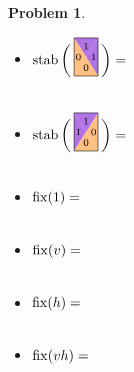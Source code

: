 \documentclass[12pt]{article}
\theoremstyle{definition} %
\newtheorem{problem}{Problem}
\begin{document}
\begin{problem}
\begin{enumerate}[(a)]
\begin{multicols}{2}
\begin{itemize}
      \item $\stab\bigg(
        \begin{tikzpicture}[yscale=1.618,scale=.6,baseline=2ex]
          \tikzstyle{every node}=[font=\scriptsize]
                \path[fill=lpurple] (.5,.5)--(1,1)--(1,0);
      \path[fill=lpurple] (.5,.5)--(0,1)--(1,1);
      \path[fill=lorange] (.5,.5)--(0,0)--(0,1);
      \path[fill=lorange] (.5,.5)--(0,0)--(1,0);
      \draw (.5,.78) node{$1$}; 
      \draw (.18,.5) node{$0$}; \draw (.82,.5) node{$1$}; 
      \draw (.5,.22) node{$0$};
      \draw (0,0) rectangle (1,1);
        \end{tikzpicture}\bigg)=$ \\ \\
  \item $\stab\bigg(
    \begin{tikzpicture}[yscale=1.618,scale=.6,baseline=2ex]
      \tikzstyle{every node}=[font=\scriptsize]        
      \path[fill=lorange] (.5,.5)--(1,1)--(1,0);
      \path[fill=lpurple] (.5,.5)--(0,1)--(1,1);
      \path[fill=lpurple] (.5,.5)--(0,0)--(0,1);
      \path[fill=lorange] (.5,.5)--(0,0)--(1,0);
      \draw (.5,.78) node{$1$}; 
      \draw (.18,.5) node{$1$}; \draw (.82,.5) node{$0$}; 
      \draw (.5,.22) node{$0$};  
      \draw (0,0) rectangle (1,1);
    \end{tikzpicture}\bigg)=$ \\ \\
    \end{itemize}
    \end{multicols}
    
    
    \begin{multicols}{2}
      \begin{itemize}
      \item $\operatorname{fix}(1)=$ \\ \\
        
      \item $\operatorname{fix}(v)=$ \\ \\
        
      \item $\operatorname{fix}(h)=$ \\ \\

      \item $\operatorname{fix}(vh)=$ \\ \\
      \end{itemize}
    \end{multicols}


\end{enumerate}
\end{problem}
\end{document}
